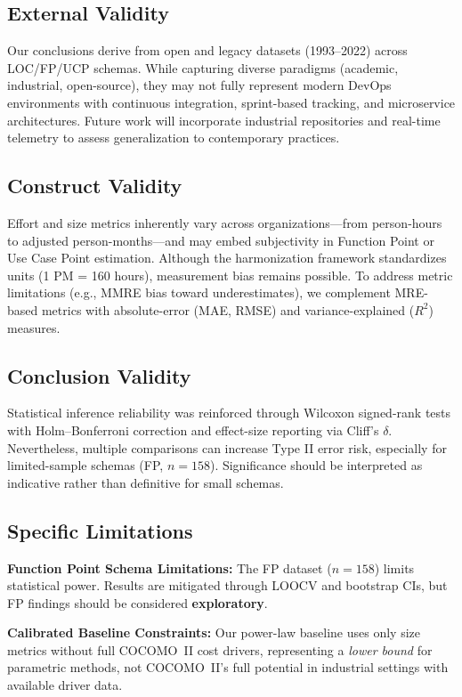 \documentclass[11pt,a4paper]{article}
\begin{document}
\subsection{External Validity}
Our conclusions derive from open and legacy datasets (1993--2022) across LOC/FP/UCP schemas. While capturing diverse paradigms (academic, industrial, open-source), they may not fully represent modern DevOps environments with continuous integration, sprint-based tracking, and microservice architectures. Future work will incorporate industrial repositories and real-time telemetry to assess generalization to contemporary practices.

\subsection{Construct Validity}
Effort and size metrics inherently vary across organizations---from person-hours to adjusted person-months---and may embed subjectivity in Function Point or Use Case Point estimation. Although the harmonization framework standardizes units (1 PM = 160 hours), measurement bias remains possible. To address metric limitations (e.g., MMRE bias toward underestimates), we complement MRE-based metrics with absolute-error (MAE, RMSE) and variance-explained ($R^2$) measures.

\subsection{Conclusion Validity}
Statistical inference reliability was reinforced through Wilcoxon signed-rank tests with Holm--Bonferroni correction and effect-size reporting via Cliff's $\delta$. Nevertheless, multiple comparisons can increase Type II error risk, especially for limited-sample schemas (FP, $n{=}158$). Significance should be interpreted as indicative rather than definitive for small schemas.

\subsection{Specific Limitations}

\textbf{Function Point Schema Limitations:} The FP dataset ($n{=}158$) limits statistical power. Results are mitigated through LOOCV and bootstrap CIs, but FP findings should be considered \textbf{exploratory}.

\textbf{Calibrated Baseline Constraints:} Our power-law baseline uses only size metrics without full COCOMO~II cost drivers, representing a \textit{lower bound} for parametric methods, not COCOMO~II's full potential in industrial settings with available driver data.
\end{document}
